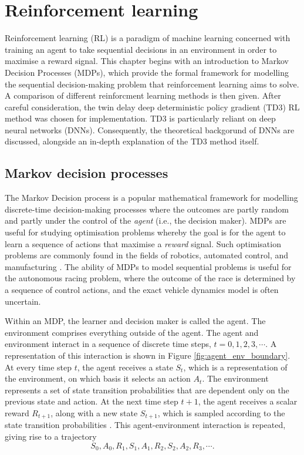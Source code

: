 \chapter{Reinforcement learning}\label{chp:rl}


Reinforcement learning (RL) is a paradigm of machine learning concerned with training an agent to take sequential decisions in an environment in order to maximise a reward signal.
This chapter begins with an introduction to Markov Decision Processes (MDPs), which provide the formal framework for modelling the sequential decision-making problem that reinforcement learning aims to solve.
A comparison of different reinforcment learning methods is then given.
After careful consideration, the twin delay deep deterministic policy gradient (TD3) RL method was chosen for implementation.
TD3 is particularly reliant on deep neural networks (DNNs). 
Consequently, the theoretical backgorund of DNNs are discussed, alongside an in-depth explanation of the TD3 method itself.


\section{Markov decision processes}\label{sec:mdps}

The Markov Decision process is a popular mathematical framework for modelling discrete-time decision-making processes where the outcomes are partly random and partly under the control of the \emph{agent} (i.e., the decision maker).
MDPs are useful for studying optimisation problems whereby the goal is for the agent to learn a sequence of actions that maximise a \emph{reward} signal.
Such optimisation problems are commonly found in the fields of robotics, automated control, and manufacturing \cite{White1985}.
The ability of MDPs to model sequential problems is useful for the autonomous racing problem, where the outcome of the race is determined by a sequence of control actions, and the exact vehicle dynamics model is often uncertain.



Within an MDP, the learner and decision maker is called the agent.
The environment comprises everything outside of the agent.
The agent and environment interact in a sequence of discrete time steps, $t=0,1,2,3, \cdots$.
A representation of this interaction is shown in Figure \ref{fig:agent_env_boundary}.
At every time step $t$, the agent receives a state $S_t$, which is a representation of the environment, on which basis it selects an action $A_t$.
The environment represents a set of state transition probabilities that are dependent only on the previous state and action.
At the next time step $t+1$, the agent receives a scalar reward $R_{t+1}$, along with a new state $S_{t+1}$, which is sampled according to the state transition probabilities \cite{sutton2020}.
This agent-environment interaction is repeated, giving rise to a trajectory
\begin{equation}\label{eq:mdp_trajectory}
S_0, A_0, R_1, S_1, A_1, R_2, S_2, A_2, R_3, \cdots.
\end{equation}


